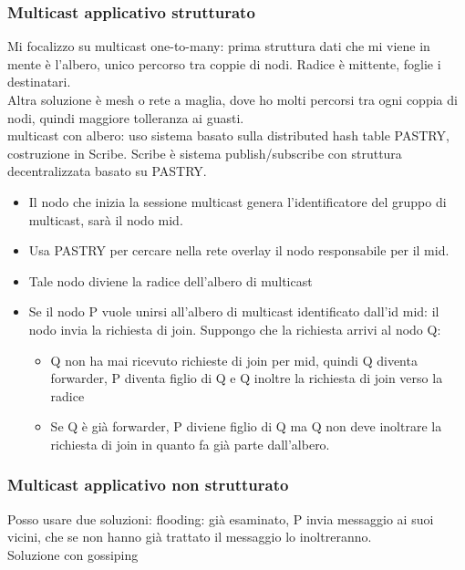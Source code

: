 \documentclass[16px]{article}
\begin{document}
\subsubsection{Multicast applicativo strutturato}
Mi focalizzo su multicast one-to-many: prima struttura dati che mi viene in mente è l'albero, unico percorso tra coppie di nodi. Radice è mittente, foglie i destinatari. \\ Altra soluzione è mesh o rete a maglia, dove ho molti percorsi tra ogni coppia di nodi, quindi maggiore tolleranza ai guasti.\\ multicast con albero: uso sistema basato sulla distributed hash table PASTRY, costruzione in Scribe. Scribe è sistema publish/subscribe con struttura decentralizzata basato su PASTRY.
\begin{itemize}
\item Il nodo che inizia la sessione multicast genera l'identificatore del gruppo di multicast, sarà il nodo mid.
\item Usa PASTRY per cercare nella rete overlay il nodo responsabile per il mid.
\item Tale nodo diviene la radice dell'albero di multicast
\item Se il nodo P vuole unirsi all'albero di multicast identificato dall'id mid: il nodo invia la richiesta di join. Suppongo che la richiesta arrivi al nodo Q:
\begin{itemize}
\item Q non ha mai ricevuto richieste di join per mid, quindi Q diventa forwarder, P diventa figlio di Q e Q inoltre la richiesta di join verso la radice
\item Se Q è già forwarder, P diviene figlio di Q ma Q non deve inoltrare la richiesta di join in quanto fa già parte dall'albero.
\end{itemize}
\end{itemize}
\subsubsection{Multicast applicativo non strutturato}
Posso usare due soluzioni:
flooding: già esaminato, P invia messaggio ai suoi vicini, che se non hanno già trattato il messaggio lo inoltreranno.\\ Soluzione con gossiping
\end{document}
